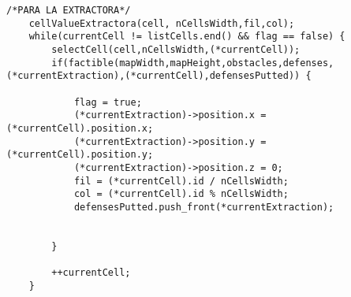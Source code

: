 \begin{lstlisting}
/*PARA LA EXTRACTORA*/
	cellValueExtractora(cell, nCellsWidth,fil,col);
	while(currentCell != listCells.end() && flag == false) {
		selectCell(cell,nCellsWidth,(*currentCell));
		if(factible(mapWidth,mapHeight,obstacles,defenses,(*currentExtraction),(*currentCell),defensesPutted)) {

		    flag = true;
		    (*currentExtraction)->position.x = (*currentCell).position.x;
		    (*currentExtraction)->position.y = (*currentCell).position.y;
		    (*currentExtraction)->position.z = 0;
		   	fil = (*currentCell).id / nCellsWidth;
		   	col = (*currentCell).id % nCellsWidth;
		    defensesPutted.push_front(*currentExtraction);


		}

		++currentCell;
	}
\end{lstlisting}
